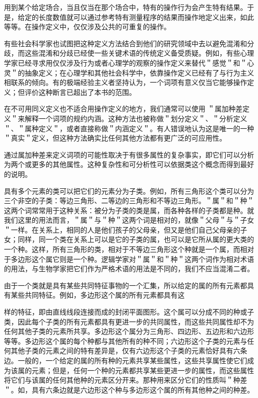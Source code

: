 用到某个给定场合，当且仅当在那个场合中，特有的操作行为会产生特有结果。于是，给定的长度数值就可以通过参考特有测量程序的结果而操作地定义出来，如此等等。在操作定义中，仅仅涉及公共的可重复的操作。

有些社会科学家也试图把这种定义方法结合到他们的研究领域中去以避免混淆和分歧，而这些混淆和分歧已经使一些关键术语的传统定义备受质疑。例如，有些心理学家已经寻求用仅仅涉及行为或者心理学的观察的操作定义来替代＂感觉＂和＂心灵＂的抽象定义；在心理学和其他社会科学中，依靠操作定义已经有了与行为主义相联系的倾向。有的极端经验主义者坚持认为，一个词项有意义仅当它能够操作定义；但评价这种断言已超出了本书的范围。

在不可用同义定义也不适合用操作定义的地方，我们通常可以使用 ＂属加种差定义＂来解释一个词项的规约内涵。这种方法也被称做＂划分定义＂、＂分析定义＂、＂属种定义＂，或者直接称做＂内涵定义＂。有人错误地认为这是唯一的一种＂真实＂定义，但这种方法确实比任何其他方法都有更广泛的可应用性。

通过属加种差来定义词项的可能性取决于有很多属性的复杂事实，即它们可以分析为两个或更多的其他属性。这种复杂性和可分析性可以依据类这个概念而得到最好的说明。

具有多个元素的类可以把它们的元素分为子类。例如，所有三角形这个类可以分为三个非空的子类：等边三角形、二等边的三角形和不等边三角形。＂属＂和＂种＂这两个词常常用于这种关系：被分为子类的类是属，而各种各样的子类都是种。就我们这里的用法而言，＂属＂与＂种＂这两个词是相对的，就像＂父母＂与＂子女＂一样。在关系上，相同的人是他们孩子的父母亲，但又是他们自己父母亲的子女；同样，同一个类在关系上可以是它的子类的属，也可以是它所从属的更大类的一个种。这样，所有三角形的类，相对于不等边三角形这个种就是一个属，而相对于多边形这个属它则是一个种。逻辑学家对＂属＂和＂种＂这两个词作为相对术语的用法，与生物学家把它们作为严格术语的用法是不同的，我们不应当混淆二者。

由于一个类就是具有某些共同特征事物的一个汇集，所以给定的属的所有元素都具有某些共同特征。例如，多边形这个属的所有元素都具有这

样的特征，即由直线线段连接而成的封闭平面图形。这个属可以分成不同的种或子类，因此每个子类的所有元素都具有更进一步的共同属性，而这些共同属性却不为任何其他子类的元素所共享。多边形这个属分为三角形、四边形、五边形和六边形等等。多边形这个属的每个种都与其他所有的种不同；六边形这个子类的元素与任何其他子类的元素之间的特有差异是，仅有六边形这个子类的元素恰好具有六条边。一般的，一个给定的属的所有种的元素共享某些属性，这些共享属性使它们成为该属的元素；但是，任何一个种的元素都共享某些更进一步的属性，而这些属性将它们与该属的任何其他种的元素区分开来。那种用来区分它们的性质叫＂种差＂。如，具有六条边就是六边形这个种与多边形这个属的所有其他种之间的种差。

